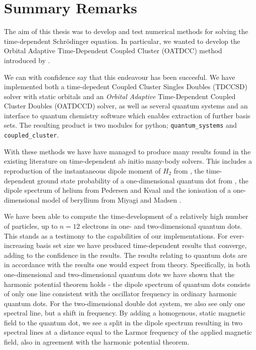 \chapter{Summary Remarks}
\label{ch:conclusion}

The aim of this thesis was to develop and test numerical methods for 
solving the time-dependent Schrödinger equation. In particular, we 
wanted to develop the Orbital Adaptive Time-Dependent Coupled Cluster 
(OATDCC) method introduced by \citeauthor{kvaal2012ab} \cite{kvaal2012ab}.

We can with confidence say that this endeavour has been succesful.
We have implemented both 
a time-depedent Coupled Cluster Singles Doubles (TDCCSD) solver with 
static orbitals and an \emph{Orbital Adaptive} Time-Dependent Coupled Cluster 
Doubles (OATDCCD) solver, as well as several quantum systems and an interface 
to quantum chemistry software which enables extraction of further basis sets.
The resulting product is two modules for python; \lstinline{quantum_systems} 
and \lstinline{coupled_cluster}.

With these methods we have have managed to produce 
many results found in the existing literature on time-dependent ab initio 
many-body solvers. This includes a reproduction of the instantaneous dipole moment
of $H_2$ from \citeauthor{li2005time} \cite{li2005time}, the time-dependent 
ground state probability of a one-dimensional quantum dot from 
\citeauthor{Zanghellini04} \cite{Zanghellini04}, the dipole spectrum of 
helium from Pedersen and Kvaal \cite{pedersen2019symplectic}
and the ionisation of a one-dimensional model of beryllium from 
Miyagi and Madsen \cite{miyagi2013time}.

We have been able to compute the time-development 
of a relatively high number of particles, up to $n=12$ electrons in one- and
two-dimensional quantum dots. This stands as a testimony to the capabilities
of our implementations. For ever-increasing basis set size we have produced 
time-dependent results that converge, adding to the confidence in the results.
The results relating to quantum dots are in accordance with the 
results one would expect from theory. Specifically, in both one-dimensional 
and two-dimensional quantum dots we have shown that the harmonic potential 
theorem \cite{kohn1961cyclotron} holds - the dipole spectrum of quantum 
dots consists of only one line consistent with the oscillator frequency in 
ordinary harmonic quantum dots. For the two-dimensional double dot system,
we also see only one spectral line, but a shift in frequency. By adding a homogenous,
static magnetic field to the quantum dot, we see a split in the dipole spectrum 
resulting in two spectral lines at a distance equal to the Larmor frequency of 
the applied magnetic field, also in agreement with the harmonic potential theorem.

